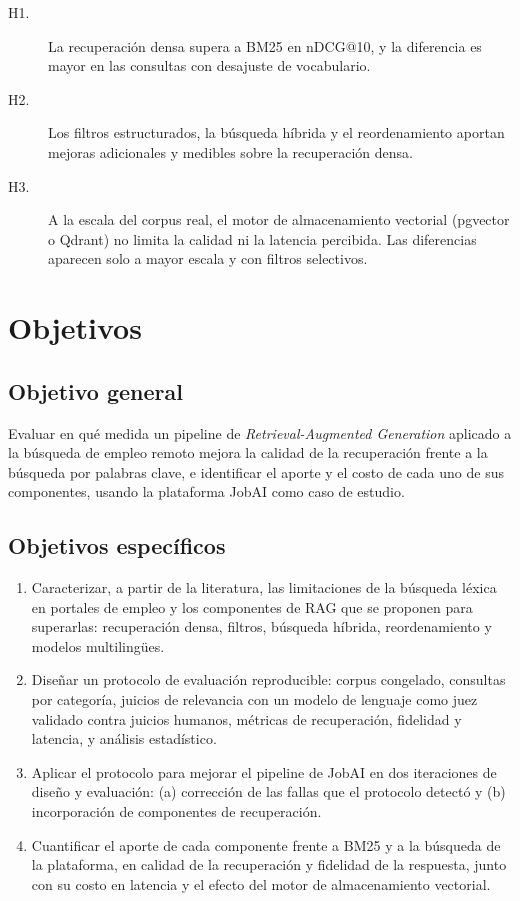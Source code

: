 \begin{description}
    \item[H1.] La recuperación densa supera a BM25 en nDCG@10, y la diferencia es mayor en las consultas con desajuste de vocabulario.
    \item[H2.] Los filtros estructurados, la búsqueda híbrida y el reordenamiento aportan mejoras adicionales y medibles sobre la recuperación densa.
    \item[H3.] A la escala del corpus real, el motor de almacenamiento vectorial (pgvector o Qdrant) no limita la calidad ni la latencia percibida. Las diferencias aparecen solo a mayor escala y con filtros selectivos.
\end{description}

\section{Objetivos}

\subsection{Objetivo general}

Evaluar en qué medida un pipeline de \textit{Retrieval-Augmented Generation} aplicado a la búsqueda de empleo remoto mejora la calidad de la recuperación frente a la búsqueda por palabras clave, e identificar el aporte y el costo de cada uno de sus componentes, usando la plataforma JobAI como caso de estudio.

\subsection{Objetivos específicos}

\begin{enumerate}
    \item Caracterizar, a partir de la literatura, las limitaciones de la búsqueda léxica en portales de empleo y los componentes de RAG que se proponen para superarlas: recuperación densa, filtros, búsqueda híbrida, reordenamiento y modelos multilingües.
    \item Diseñar un protocolo de evaluación reproducible: corpus congelado, consultas por categoría, juicios de relevancia con un modelo de lenguaje como juez validado contra juicios humanos, métricas de recuperación, fidelidad y latencia, y análisis estadístico.
    \item Aplicar el protocolo para mejorar el pipeline de JobAI en dos iteraciones de diseño y evaluación: (a) corrección de las fallas que el protocolo detectó y (b) incorporación de componentes de recuperación.
    \item Cuantificar el aporte de cada componente frente a BM25 y a la búsqueda de la plataforma, en calidad de la recuperación y fidelidad de la respuesta, junto con su costo en latencia y el efecto del motor de almacenamiento vectorial.
\end{enumerate}

